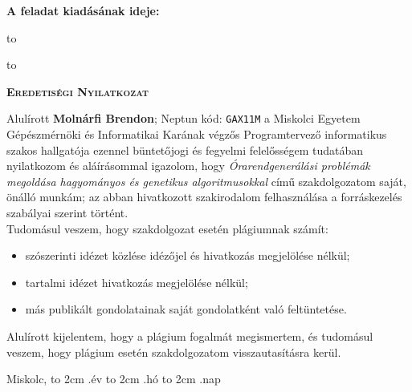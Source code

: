 \documentclass[12pt,a4paper]{report}
\begin{document}

\noindent\textbf{A feladat kiadásának ideje:}\newline


\vskip 2cm

\hbox to 

\hbox to 

\newpage

\vspace*{1cm}  
\begin{center}
\large\textsc{\bfseries Eredetiségi Nyilatkozat}
\end{center}
\vspace*{2cm}  

Alulírott \textbf{Molnárfi Brendon}; Neptun kód: \texttt{GAX11M} a Miskolci Egyetem Gépészmérnöki és Informatikai Karának végzős Programtervező informatikus szakos hallgatója ezennel büntetőjogi és fegyelmi felelősségem tudatában nyilatkozom és aláírásommal igazolom, hogy \textit{Órarendgenerálási problémák megoldása hagyományos és genetikus algoritmusokkal} című szakdolgozatom saját, önálló munkám; az abban hivatkozott szakirodalom
felhasználása a forráskezelés szabályai szerint történt.\\

Tudomásul veszem, hogy szakdolgozat esetén plágiumnak számít:
\begin{itemize}
\item szószerinti idézet közlése idézőjel és hivatkozás megjelölése nélkül;
\item tartalmi idézet hivatkozás megjelölése nélkül;
\item más publikált gondolatainak saját gondolatként való feltüntetése.
\end{itemize}

Alulírott kijelentem, hogy a plágium fogalmát megismertem, és tudomásul veszem, hogy
plágium esetén szakdolgozatom visszautasításra kerül.

\vspace*{3cm}

\noindent Miskolc, \hbox to 2cm{\dotfill} .év \hbox to 2cm{\dotfill} .hó \hbox to 2cm{\dotfill} .nap
\end{document}
